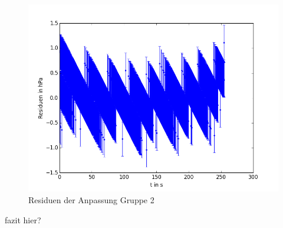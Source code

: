 \documentclass[11pt]{beamer}
\begin{document}
\begin{frame}
\begin{figure}[H]
\centering
\includegraphics[scale=0.5]{Bilder/residuen_dichtigkeit_EL.png}
\caption{Residuen der Anpassung Gruppe 2}
\end{figure}
\end{frame}
\begin{frame}
fazit hier?
\end{frame}
\end{document}
